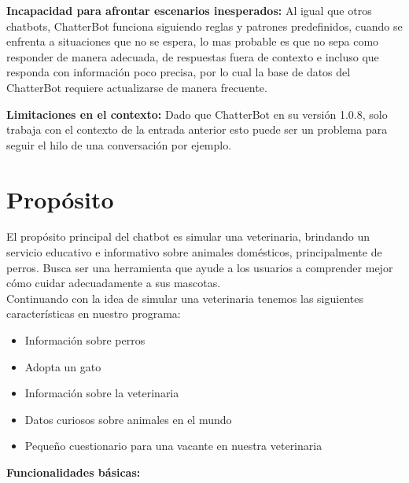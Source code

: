 \documentclass[a4paper,12pt]{article}
\begin{document}
\textbf{Incapacidad para afrontar escenarios inesperados:}  Al igual que otros chatbots, ChatterBot funciona 
siguiendo reglas y patrones predefinidos, cuando se enfrenta a situaciones que no se espera, lo mas probable es que 
no sepa como responder de manera adecuada, de respuestas fuera de contexto e incluso que responda con información 
poco precisa, por lo cual la base de datos del ChatterBot requiere actualizarse de manera frecuente.

\textbf{Limitaciones en el contexto:} Dado que ChatterBot en su versión 1.0.8, solo trabaja con el contexto de 
la entrada anterior esto puede ser un problema para seguir el hilo de una conversación por ejemplo. 




\section{Propósito}

El propósito principal del chatbot es simular una veterinaria, brindando un servicio educativo e informativo sobre animales domésticos, principalmente de perros. Busca ser una herramienta que ayude a los usuarios a comprender mejor cómo cuidar adecuadamente a sus mascotas.\\

Continuando con la idea de simular una veterinaria tenemos las siguientes características en nuestro programa:
\begin{itemize}
    \item Información sobre perros
    \item Adopta un gato 
    \item Información sobre la veterinaria
    \item Datos curiosos sobre animales en el mundo
    \item Pequeño cuestionario para una vacante en nuestra veterinaria
\end{itemize}


\textbf{Funcionalidades básicas:}
\end{document}

